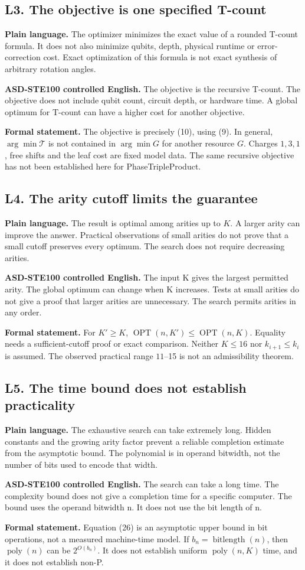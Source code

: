 \documentclass[11pt,letterpaper]{article}
\newcommand{\OPT}{\operatorname{OPT}}
\newcommand{\bits}{\operatorname{bitlength}}
\newcommand{\cost}{\mathcal T}
\newcommand{\Plain}[1]{\par\textbf{\color{navy}Plain language.} #1\par}
\newcommand{\STE}[1]{\par\textbf{\color{teal}ASD-STE100 controlled English.} #1\par}
\newcommand{\Formal}[1]{\par\textbf{Formal statement.} #1\par}
\begin{document}
\clearpage
\subsection{L3. The objective is one specified T-count}
\Plain{The optimizer minimizes the exact value of a rounded T-count
formula. It does not also minimize qubits, depth, physical runtime
or error-correction cost. Exact optimization of this formula is
not exact synthesis of arbitrary rotation angles.}
\STE{The objective is the recursive T-count. The objective does not include qubit count, circuit depth, or hardware time. A global optimum for T-count can have a higher cost for another objective.}
\Formal{The objective is precisely (10), using (9). In general,
\(\arg\min\cost\) is not contained in \(\arg\min G\) for another
resource \(G\). Charges \(1,3,1\), free shifts and the leaf cost
are fixed model data. The same recursive objective has not been
established here for PhaseTripleProduct.}

\subsection{L4. The arity cutoff limits the guarantee}
\Plain{The result is optimal among arities up to \(K\). A larger
arity can improve the answer. Practical observations of small
arities do not prove that a small cutoff preserves every optimum.
The search does not require decreasing arities.}
\STE{The input K gives the largest permitted arity. The global optimum can change when K increases. Tests at small arities do not give a proof that larger arities are unnecessary. The search permits arities in any order.}
\Formal{For \(K'\ge K\),
\(\OPT(n,K')\le\OPT(n,K)\).
Equality needs a sufficient-cutoff proof or exact comparison.
Neither \(K\le16\) nor \(k_{i+1}\le k_i\) is assumed.
The observed practical range \(11\)--15 is not an admissibility theorem.}

\clearpage
\subsection{L5. The time bound does not establish practicality}
\Plain{The exhaustive search can take extremely long. Hidden
constants and the growing arity factor prevent a reliable completion
estimate from the asymptotic bound. The polynomial is in operand
bitwidth, not the number of bits used to encode that width.}
\STE{The search can take a long time. The complexity bound does not give a completion time for a specific computer. The bound uses the operand bitwidth n. It does not use the bit length of n.}
\Formal{Equation (26) is an asymptotic upper bound in bit operations,
not a measured machine-time model. If \(b_n=\bits(n)\), then
\(\operatorname{poly}(n)\) can be \(2^{O(b_n)}\).
It does not establish uniform \(\operatorname{poly}(n,K)\) time,
and it does not establish non-P.}
\end{document}
